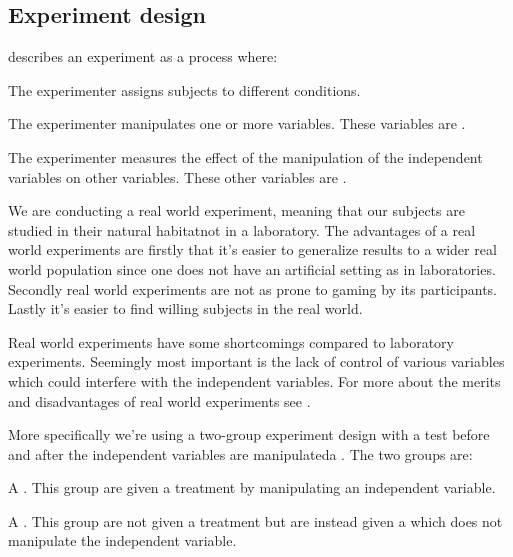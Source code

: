 \subsection{Experiment design}
\label{section:empirical.methodology.experiment.design}

\citet[]{robson93} describes an experiment as a process where:


\begin{items}
  \item The experimenter assigns subjects to different conditions.
  \item The experimenter manipulates one or more variables.
    These variables are .
  \item The experimenter measures the effect of the manipulation of
    the independent variables on other variables. These other
    variables are .
\end{items}

We are conducting a real world experiment, meaning that our subjects
are studied in their natural habitat\dash{}not in a laboratory.
The advantages of a real world experiments are firstly that it's easier to
generalize results to a wider real world population since one does not have
an artificial setting as in laboratories. Secondly real world experiments are
not as prone to gaming by its participants. Lastly it's easier to find willing
subjects in the real world.

Real world experiments have some shortcomings compared to laboratory
experiments. Seemingly most important is the lack of control of various
variables which could interfere with the independent variables.
For more about the merits and disadvantages of real world experiments
see \citet[]{robson93}.

More specifically we're using a two-group experiment design with a test before
and after the independent variables are manipulated\dash{}a .
The two groups are:

\begin{items}
  \item A . This group are given a treatment by
    manipulating an independent variable.
  \item A . This group are not given a treatment but are
    instead given a  which does not manipulate the independent
    variable.
\end{items}

